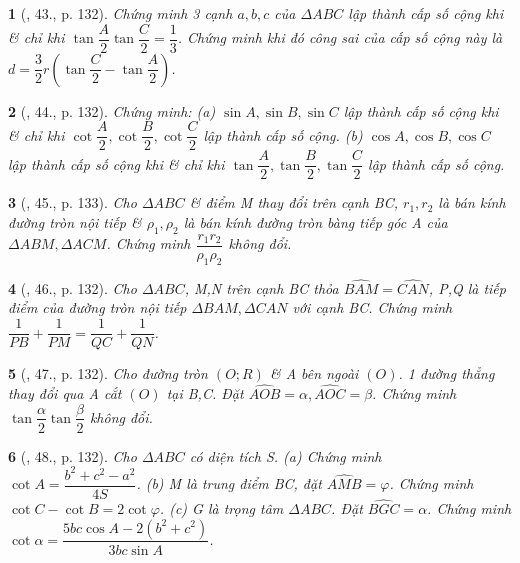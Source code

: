 \documentclass{article}
\newtheorem{baitoan}{}
\begin{document}
\begin{baitoan}[\cite{TLCT_hinh_hoc_10}, 43., p. 132]
	Chứng minh 3 cạnh $a,b,c$ của $\Delta ABC$ lập thành cấp số cộng khi \& chỉ khi $\tan\dfrac{A}{2}\tan\dfrac{C}{2} = \dfrac{1}{3}$. Chứng minh khi đó công sai của cấp số cộng này là $d = \dfrac{3}{2}r\left(\tan\dfrac{C}{2} - \tan\dfrac{A}{2}\right)$.
\end{baitoan}

\begin{baitoan}[\cite{TLCT_hinh_hoc_10}, 44., p. 132]
	Chứng minh: (a) $\sin A,\sin B,\sin C$ lập thành cấp số cộng khi \& chỉ khi $\cot\dfrac{A}{2},\cot\dfrac{B}{2},\cot\dfrac{C}{2}$ lập thành cấp số cộng. (b) $\cos A,\cos B,\cos C$ lập thành cấp số cộng khi \& chỉ khi $\tan\dfrac{A}{2},\tan\dfrac{B}{2},\tan\dfrac{C}{2}$ lập thành cấp số cộng.
\end{baitoan}

\begin{baitoan}[\cite{TLCT_hinh_hoc_10}, 45., p. 133]
	Cho $\Delta ABC$ \& điểm M thay đổi trên cạnh BC, $r_1,r_2$ là bán kính đường tròn nội tiếp \& $\rho_1,\rho_2$ là bán kính đường tròn bàng tiếp góc A của $\Delta ABM,\Delta ACM$. Chứng minh $\dfrac{r_1r_2}{\rho_1\rho_2}$ không đổi.
\end{baitoan}

\begin{baitoan}[\cite{TLCT_hinh_hoc_10}, 46., p. 132]
	Cho $\Delta ABC$, M,N trên cạnh BC thỏa $\widehat{BAM} = \widehat{CAN}$, P,Q là tiếp điểm của đường tròn nội tiếp $\Delta BAM,\Delta CAN$ với cạnh BC. Chứng minh $\dfrac{1}{PB} + \dfrac{1}{PM} = \dfrac{1}{QC} + \dfrac{1}{QN}$.
\end{baitoan}

\begin{baitoan}[\cite{TLCT_hinh_hoc_10}, 47., p. 132]
	Cho đường tròn $(O;R)$ \& A bên ngoài $(O)$. 1 đường thẳng thay đổi qua A cắt $(O)$ tại B,C. Đặt $\widehat{AOB} = \alpha,\widehat{AOC} = \beta$. Chứng minh $\tan\dfrac{\alpha}{2}\tan\dfrac{\beta}{2}$ không đổi.
\end{baitoan}

\begin{baitoan}[\cite{TLCT_hinh_hoc_10}, 48., p. 132]
	Cho $\Delta ABC$ có diện tích S. (a) Chứng minh $\cot A = \dfrac{b^2 + c^2 - a^2}{4S}$. (b) M là trung điểm BC, đặt $\widehat{AMB} = \varphi$. Chứng minh $\cot C - \cot B = 2\cot\varphi$. (c) G là trọng tâm $\Delta ABC$. Đặt $\widehat{BGC} = \alpha$. Chứng minh $\cot\alpha = \dfrac{5bc\cos A - 2(b^2 + c^2)}{3bc\sin A}$.
\end{baitoan}
\end{document}
